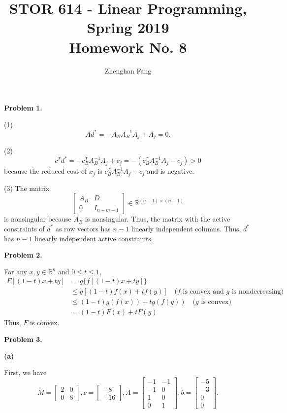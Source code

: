 \documentclass[12pt]{article}
\def\name{Zhenghan Fang}
\begin{document}
 


\title{STOR 614 - Linear Programming, Spring 2019 \\
Homework No. 8}
\author{\name}

\maketitle

\noindent
\textbf{Problem 1.}

(1) \[ Ad^* = -A_B A_B^{-1} A_j + A_j = 0. \]

(2) \[c^Td^* = -c_B^T A_B^{-1} A_j + c_j = -(c_B^T A_B^{-1} A_j - c_j) >0 \]
because the reduced cost of $x_j$ is $c_B^T A_B^{-1} A_j - c_j$ and is negative.

(3) The matrix
\[\begin{bmatrix} A_B & D \\ 0 & I_{n-m-1} \end{bmatrix} \in \mathbb{R}^{(n-1)\times(n-1)}\]
is nonsingular because $A_B$ is nonsingular. Thus, the matrix with the active constraints of $d^*$ as row vectors has $n-1$ linearly independent columns. Thus, $d^*$ has $n-1$ linearly independent active constraints.

\noindent
\textbf{Problem 2.}

For any $x, y\in \mathbb{R}^n$ and $0 \le t \le 1$,
\begin{align*}
    F[(1-t) x+ty] & = g\{f[(1-t) x+ty]\} \\
    & \le g[(1-t)f(x)+tf(y)] \quad \text{($f$ is convex and $g$ is nondecreasing)} \\
    & \le (1-t)g(f(x)) + tg(f(y)) \quad \text{($g$ is convex)}\\
    & = (1-t)F(x) + tF(y)
\end{align*}
Thus, $F$ is convex.

\noindent
\textbf{Problem 3.}

\noindent
\textbf{(a)}

First, we have
\[M = \begin{bmatrix} 2&0\\0&8 \end{bmatrix}, c= \begin{bmatrix} -8\\-16 \end{bmatrix}, A=\begin{bmatrix} -1&-1\\-1&0\\1&0\\0&1 \end{bmatrix},b=\begin{bmatrix} -5\\-3\\0\\0 \end{bmatrix}.\]
\end{document}
